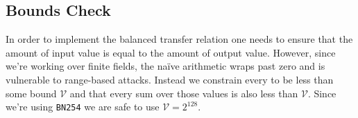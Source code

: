 \subsection{\AssetValue{} Bounds Check}

In order to implement the balanced transfer relation one needs to ensure that the amount of input value is equal to the amount of output value. However, since we're working over finite fields, the na\"ive arithmetic wraps past zero and is vulnerable to range-based attacks. Instead we constrain every \AssetValue{} to be less than some bound $\mathcal{V}$ and that every sum over those values is also less than $\mathcal{V}$. Since we're using \texttt{BN254} we are safe to use $\mathcal{V} = 2^{128}$.
